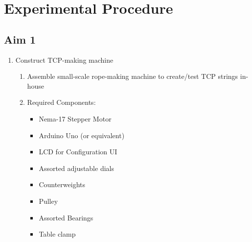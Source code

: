 \section{Experimental Procedure}
\label{chap:experiments}

\subsection{Aim 1}
	\begin{enumerate}
		\item Construct TCP-making machine
		\begin{enumerate}
			\item Assemble small-scale rope-making machine to create/test TCP strings in-house
			\item Required Components:
			\begin{itemize}
				\item Nema-17 Stepper Motor
				\item Arduino Uno (or equivalent)
				\item LCD for Configuration UI
				\item Assorted adjustable dials
				\item Counterweights
				\item Pulley
				\item Assorted Bearings
				\item Table clamp
			\end{itemize}
		\end{enumerate}
		

\end{enumerate}
